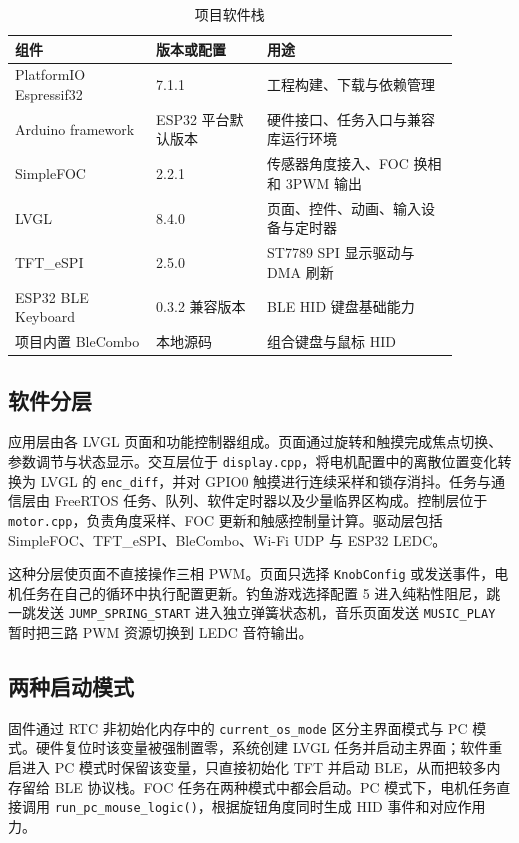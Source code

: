 \begin{table}[H]
\centering
\small
\begin{tabular}{p{0.28\linewidth}p{0.22\linewidth}p{0.38\linewidth}}
\toprule
组件 & 版本或配置 & 用途 \\
\midrule
PlatformIO Espressif32 & 7.1.1 & 工程构建、下载与依赖管理 \\
Arduino framework & ESP32 平台默认版本 & 硬件接口、任务入口与兼容库运行环境 \\
SimpleFOC & 2.2.1 & 传感器角度接入、FOC 换相和 3PWM 输出 \\
LVGL & 8.4.0 & 页面、控件、动画、输入设备与定时器 \\
TFT\_eSPI & 2.5.0 & ST7789 SPI 显示驱动与 DMA 刷新 \\
ESP32 BLE Keyboard & 0.3.2 兼容版本 & BLE HID 键盘基础能力 \\
项目内置 BleCombo & 本地源码 & 组合键盘与鼠标 HID \\
\bottomrule
\end{tabular}
\caption{项目软件栈}
\label{tab:software-stack}
\end{table}

\subsection{软件分层}

应用层由各 LVGL 页面和功能控制器组成。页面通过旋转和触摸完成焦点切换、参数调节与状态显示。交互层位于 \texttt{display.cpp}，将电机配置中的离散位置变化转换为 LVGL 的 \texttt{enc\_diff}，并对 GPIO0 触摸进行连续采样和锁存消抖。任务与通信层由 FreeRTOS 任务、队列、软件定时器以及少量临界区构成。控制层位于 \texttt{motor.cpp}，负责角度采样、FOC 更新和触感控制量计算。驱动层包括 SimpleFOC、TFT\_eSPI、BleCombo、Wi-Fi UDP 与 ESP32 LEDC。

这种分层使页面不直接操作三相 PWM。页面只选择 \texttt{KnobConfig} 或发送事件，电机任务在自己的循环中执行配置更新。钓鱼游戏选择配置 5 进入纯粘性阻尼，跳一跳发送 \texttt{JUMP\_SPRING\_START} 进入独立弹簧状态机，音乐页面发送 \texttt{MUSIC\_PLAY} 暂时把三路 PWM 资源切换到 LEDC 音符输出。

\subsection{两种启动模式}

固件通过 RTC 非初始化内存中的 \texttt{current\_os\_mode} 区分主界面模式与 PC 模式。硬件复位时该变量被强制置零，系统创建 LVGL 任务并启动主界面；软件重启进入 PC 模式时保留该变量，只直接初始化 TFT 并启动 BLE，从而把较多内存留给 BLE 协议栈。FOC 任务在两种模式中都会启动。PC 模式下，电机任务直接调用 \texttt{run\_pc\_mouse\_logic()}，根据旋钮角度同时生成 HID 事件和对应作用力。

